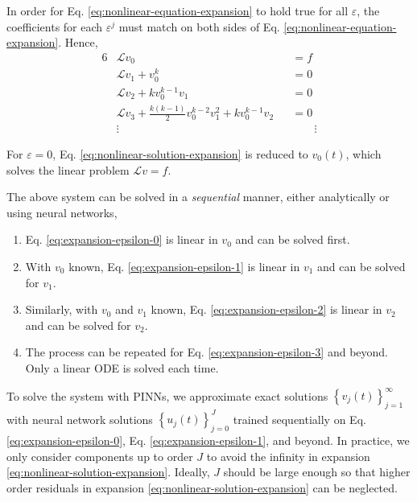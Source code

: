 \documentclass{uai2023}
\renewcommand{\L}{\mathcal{L}}
\begin{document}
    In order for Eq. \ref{eq:nonlinear-equation-expansion} to hold true for all $\varepsilon$, the coefficients for each $\varepsilon^j$ must match on both sides of Eq. \ref{eq:nonlinear-equation-expansion}. Hence,
    {
        \small
        \begin{alignat}{6}
            &\L v_0 &&= f \label{eq:expansion-epsilon-0}\\
            &\L v_1 + v_0^k &&= 0 \label{eq:expansion-epsilon-1}\\
            &\L v_2 + k v_0^{k-1}v_1 &&= 0 \label{eq:expansion-epsilon-2} \\
            &\L v_3 + \frac{k(k-1)}{2} v_0^{k-2}v_1^2 + k v_0^{k-1}v_2 &&= 0 \label{eq:expansion-epsilon-3} \\[-1em]
            &\vdots &&\phantom{=}\,\,\,\,\vdots\nonumber
        \end{alignat}
    }

    For $\varepsilon = 0$, Eq. \ref{eq:nonlinear-solution-expansion} is reduced to $v_0(t)$, which solves the linear problem $\L v=f$. 

    \begingroup
        \setlength{\itemsep}{0pt}
        \setlength{\parskip}{0pt}
        The above system can be solved in a \textit{sequential} manner, either analytically or using neural networks,
        \begin{enumerate}
            \item Eq. \ref{eq:expansion-epsilon-0} is linear in $v_0$ and can be solved first. 
            \item With $v_0$ known, Eq. \ref{eq:expansion-epsilon-1} is linear in $v_1$ and can be solved for $v_1$. 
            \item Similarly, with $v_0$ and $v_1$ known, Eq. \ref{eq:expansion-epsilon-2} is linear in $v_2$ and can be solved for $v_2$.
            \item The process can be repeated for Eq. \ref{eq:expansion-epsilon-3} and beyond. Only a linear ODE is solved each time.
        \end{enumerate}
        To solve the system with PINNs, we approximate exact solutions $\left\{v_j(t)\right\}_{j=1}^{\infty}$ with neural network solutions $\left\{u_j(t)\right\}_{j=0}^{J}$ trained sequentially on Eq. \ref{eq:expansion-epsilon-0}, Eq. \ref{eq:expansion-epsilon-1}, and beyond. 
        In practice, we only consider components up to order $J$ to avoid the infinity in expansion \ref{eq:nonlinear-solution-expansion}. 
        Ideally, $J$ should be large enough so that higher order residuals in expansion \ref{eq:nonlinear-solution-expansion} can be neglected.
    \endgroup
\end{document}
